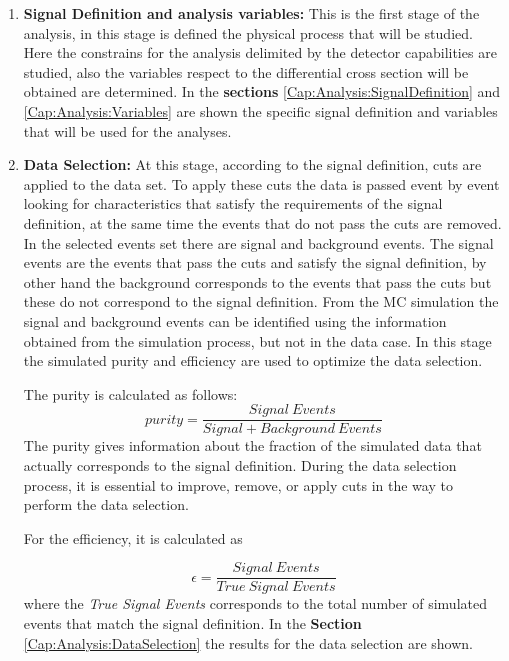 \begin{enumerate}
    \item \textbf{Signal Definition and analysis variables:} This is the first stage of the analysis, in this stage is defined the physical process that will be studied. Here the constrains for the analysis delimited by the detector capabilities are studied, also the variables respect to the differential cross section will be obtained are determined. In the \textbf{sections} \ref{Cap:Analysis:SignalDefinition} and \ref{Cap:Analysis:Variables} are shown the specific signal definition and variables that will be used for the analyses. 

    \item \textbf{Data Selection:} At this stage, according to the signal definition, cuts are applied to the data set. To apply these cuts the data is passed event by event looking for characteristics that satisfy the requirements of the signal definition, at the same time the events that do not pass the cuts are removed. In the selected events set there are signal and background events. The signal events are the events that pass the cuts and satisfy the signal definition, by other hand the background corresponds to the events that pass the cuts but these do not correspond to the signal definition. From the MC simulation the signal and background events can be identified using the information obtained from the simulation process, but not in the data case. In this stage the simulated purity and efficiency are used to optimize the data selection. 

    The purity is calculated as follows:
    \begin{equation}
        purity=\frac{Signal\ Events}{Signal+Background\ Events}
        \label{eq:Analysis:Purity}
    \end{equation}
    The purity gives information about the fraction of the simulated data that actually corresponds to the signal definition. During the data selection process, it is essential to improve, remove, or apply cuts in the way to perform the data selection.

    For the efficiency, it is calculated as 
    
    \begin{equation}
        \epsilon=\frac{Signal\ Events}{True\ Signal\ Events}
        \label{eq:Analysis:efficiency}
    \end{equation}
    where the \textit{True Signal Events} corresponds to the total number of simulated events that match the signal definition. 
    In the \textbf{Section} \ref{Cap:Analysis:DataSelection} the results for the data selection are shown. 


\end{enumerate}
